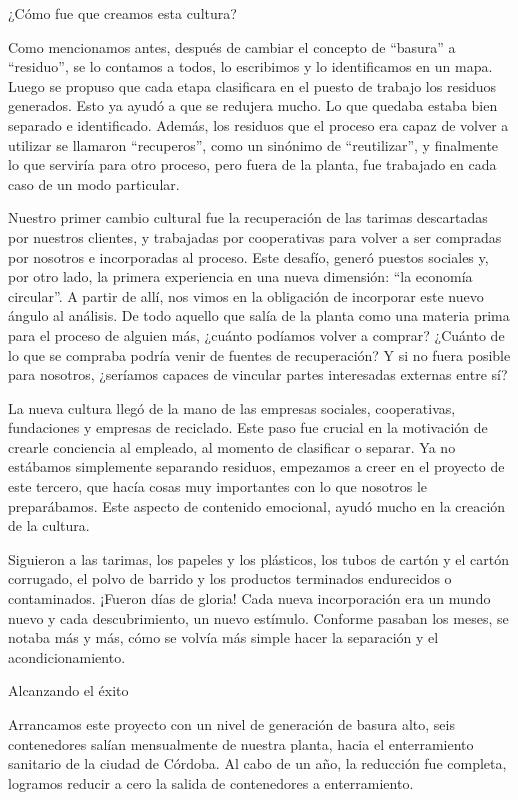 \begin{fullwidth}
¿Cómo fue que creamos esta cultura?

Como mencionamos antes, después de cambiar el concepto de ``basura'' a
``residuo'', se lo contamos a todos, lo escribimos y lo identificamos en
un mapa. Luego se propuso que cada etapa clasificara en el puesto de
trabajo los residuos generados. Esto ya ayudó a que se redujera mucho.
Lo que quedaba estaba bien separado e identificado. Además, los residuos
que el proceso era capaz de volver a utilizar se llamaron ``recuperos'',
como un sinónimo de ``reutilizar'', y finalmente lo que serviría para
otro proceso, pero fuera de la planta, fue trabajado en cada caso de un
modo particular.

Nuestro primer cambio cultural fue la recuperación de las tarimas
descartadas por nuestros clientes, y trabajadas por cooperativas para
volver a ser compradas por nosotros e incorporadas al proceso. Este
desafío, generó puestos sociales y, por otro lado, la primera
experiencia en una nueva dimensión: ``la economía circular''. A partir
de allí, nos vimos en la obligación de incorporar este nuevo ángulo al
análisis. De todo aquello que salía de la planta como una materia prima
para el proceso de alguien más, ¿cuánto podíamos volver a comprar?
¿Cuánto de lo que se compraba podría venir de fuentes de recuperación? Y
si no fuera posible para nosotros, ¿seríamos capaces de vincular partes
interesadas externas entre sí?

La nueva cultura llegó de la mano de las empresas sociales,
cooperativas, fundaciones y empresas de reciclado. Este paso fue crucial
en la motivación de crearle conciencia al empleado, al momento de
clasificar o separar. Ya no estábamos simplemente separando residuos,
empezamos a creer en el proyecto de este tercero, que hacía cosas muy
importantes con lo que nosotros le preparábamos. Este aspecto de
contenido emocional, ayudó mucho en la creación de la cultura.

Siguieron a las tarimas, los papeles y los plásticos, los tubos de
cartón y el cartón corrugado, el polvo de barrido y los productos
terminados endurecidos o contaminados. ¡Fueron días de gloria! Cada
nueva incorporación era un mundo nuevo y cada descubrimiento, un nuevo
estímulo. Conforme pasaban los meses, se notaba más y más, cómo se
volvía más simple hacer la separación y el acondicionamiento.

Alcanzando el éxito

Arrancamos este proyecto con un nivel de generación de basura alto, seis
contenedores salían mensualmente de nuestra planta, hacia el
enterramiento sanitario de la ciudad de Córdoba. Al cabo de un año, la
reducción fue completa, logramos reducir a cero la salida de
contenedores a enterramiento.


\end{fullwidth}
